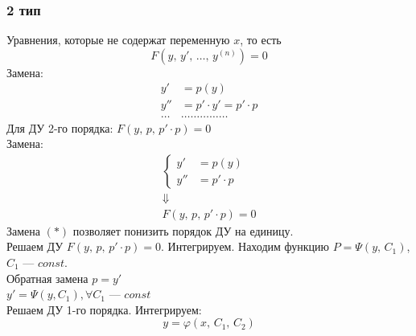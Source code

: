 \subsubsection*{2 тип}
Уравнения, которые не содержат переменную $x$, то есть
\[
    \boxed{F\left(y,\, y',\, \ldots,\, y^{(n)}\right) = 0}
\]
Замена: \vspace{-\topsep}
\begin{align*}
    y' &= p(y) \\
    y'' &= p'\cdot y' = p' \cdot p \\
    \ldots&\ldots\ldots\ldots\ldots\ldots
\end{align*}
Для ДУ 2-го порядка: $\boxed{F(y,\, p,\, p'\cdot p) = 0}$ \\[1ex]
Замена:
\begin{gather*}
    \left\{ \begin{aligned}
        y' &= p(y) \\
        y'' &= p'\cdot p
    \end{aligned} \right. \tag{$*$} \\
    \Downarrow \\
    \boxed{F(y,\, p,\, p'\cdot p) = 0}
\end{gather*} 
Замена $(*)$ позволяет понизить порядок ДУ на единицу. \\[1ex]
 Решаем ДУ $F(y,\, p,\, p'\cdot p) = 0$. Интегрируем. Находим функцию $P = \Psi(y,\, C_1)$,\break$C_1$ --- $const$. \\[1ex]
 Обратная замена $p = y'$ \\[1ex]
 $y' = \Psi (y, C_1), \forall C_1$ --- $const$ \\[1ex]
Решаем ДУ 1-го порядка. Интегрируем:
\[
    y = \varphi (x,\, C_1,\, C_2)
\]


